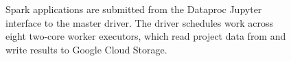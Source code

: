 \documentclass[11pt,a4paper]{article}
\begin{document}
\begin{figure}[htbp]
\caption{Spark applications are submitted from the Dataproc Jupyter interface
to the master driver. The driver schedules work across eight two-core worker
executors, which read project data from and write results to Google Cloud
Storage.}
\label{fig:runtime}
\end{figure}
\end{document}
